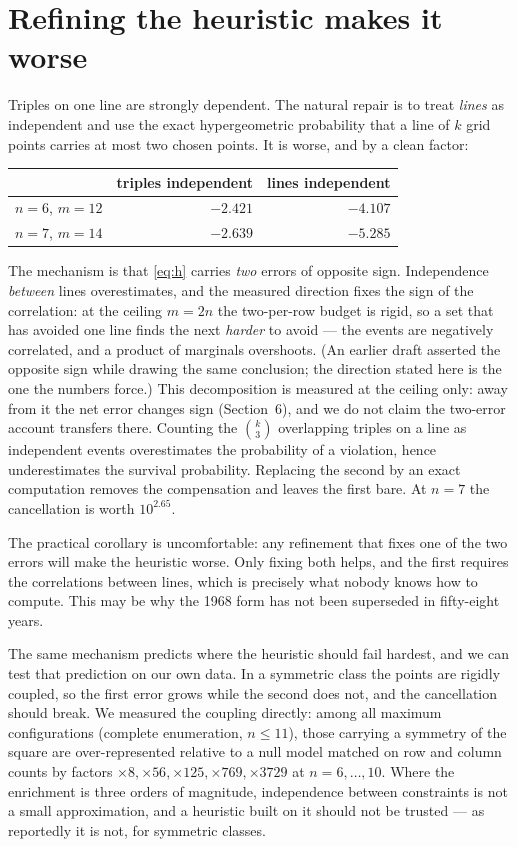 \documentclass[11pt,a4paper]{article}
\begin{document}
\section{Refining the heuristic makes it worse}
Triples on one line are strongly dependent.  The natural repair is to treat \emph{lines} as
independent and use the exact hypergeometric probability that a line of $k$ grid points carries at
most two chosen points.  It is worse, and by a clean factor:
\begin{center}
\begin{tabular}{rrr}
\toprule
 & triples independent & lines independent \\
\midrule
$n=6$, $m=12$ & $-2.421$ & $-4.107$\\
$n=7$, $m=14$ & $-2.639$ & $-5.285$\\
\bottomrule
\end{tabular}
\end{center}
The mechanism is that \eqref{eq:h} carries \emph{two} errors of opposite sign.  Independence
\emph{between} lines overestimates, and the measured direction fixes the sign of the correlation:
at the ceiling $m=2n$ the two-per-row budget is rigid, so a set that has avoided one line finds
the next \emph{harder} to avoid --- the events are negatively correlated, and a product of
marginals overshoots.  (An earlier draft asserted the opposite sign while drawing the same
conclusion; the direction stated here is the one the numbers force.)  This decomposition is
measured at the ceiling only: away from it the net error changes sign (Section~6), and we do not
claim the two-error account transfers there.  Counting the $\binom{k}{3}$ overlapping triples on a line as independent events
overestimates the probability of a violation, hence underestimates the survival probability.
Replacing the second by an exact computation removes the compensation and leaves the first bare.
At $n=7$ the cancellation is worth $10^{2.65}$.

The practical corollary is uncomfortable: any refinement that fixes one of the two errors will make
the heuristic worse.  Only fixing both helps, and the first requires the correlations between lines,
which is precisely what nobody knows how to compute.  This may be why the 1968 form has not been
superseded in fifty-eight years.

The same mechanism predicts where the heuristic should fail hardest, and we can test that
prediction on our own data.  In a symmetric class the points are rigidly coupled, so the first
error grows while the second does not, and the cancellation should break.  We measured the
coupling directly: among all maximum configurations (complete enumeration, $n\le11$), those
carrying a symmetry of the square are over-represented relative to a null model matched on row and
column counts by factors $\times8,\times56,\times125,\times769,\times3729$ at $n=6,\dots,10$.
Where the enrichment is three orders of magnitude, independence between constraints is not a
small approximation, and a heuristic built on it should not be trusted --- as reportedly it is
not, for symmetric classes.
\end{document}

